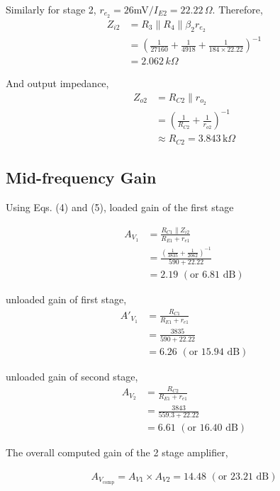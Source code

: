 Similarly for stage 2, $r_{e_2}=26$mV$/I_{E2}=22.22\,\Omega$. Therefore,
\begin{align*}
    Z_{i2} &= R_3 \parallel R_4 \parallel \beta_2 r_{e_2}\\
    &= \left( \frac{1}{27160} + \frac{1}{4918} + \frac{1}{184 \times 22.22} \right)^{-1}\\
    &= 2.062\,k\Omega
\end{align*}

And output impedance,
\begin{align*}
    Z_{o2} &= R_{C2} \parallel r_{o_2} \\
    &= \left( \frac{1}{R_{C2}}+\frac{1}{r_{o2}}\right)^{-1} \\
    &\approx R_{C2}=3.843\,\text{k}\Omega
\end{align*}

\subsection*{Mid-frequency Gain}

Using Eqs. (4) and (5), loaded gain of the first stage

\begin{align*}
    A_{V_1} &= \frac{R_{C1} \parallel Z_{i2}}{R_{E1} + r_{e1}}\\
    &=\frac{\left( \frac{1}{3835} + \frac{1}{2062}\right)^{-1}}{590+22.22}\\
    &= 2.19\,\,(\text{or 6.81 dB})
\end{align*}

unloaded gain of first stage,
\begin{align*}
    A'_{V_1} &= \frac{R_{C1}}{R_{E1} + r_{e1}}\\
    &=\frac{3835}{590+22.22}\\
    &= 6.26\,\,(\text{or 15.94 dB})
\end{align*}

unloaded gain of second stage,
\begin{align*}
    A_{V_2} &= \frac{R_{C2}}{R_{E1} + r_{e1}}\\
    &=\frac{3843}{559.3+22.22}\\
    &= 6.61\,\,(\text{or 16.40 dB})
\end{align*}

The overall computed gain of the 2 stage amplifier,

\begin{align*}
    A_{V_\text{comp}}=A_{V1}\times A_{V2} = 14.48\,\,(\text{or 23.21 dB})
\end{align*}

